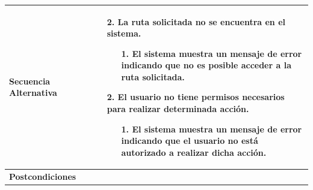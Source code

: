 \begin{longtable}{| p{4cm} | p{10cm} |}
\hline
\textbf{Secuencia Alternativa} &\mbox{}\par\vspace{-\baselineskip}
\begin{enumerate}[leftmargin=0.9cm, topsep=0.1cm]
\item[2.] La ruta solicitada no se encuentra en el sistema.
	\begin{itemize}
	\item[1.] El sistema muestra un mensaje de error indicando que no es posible acceder a la ruta solicitada.
	\end{itemize}
\item[2.] El usuario no tiene permisos necesarios para realizar determinada acción.
	\begin{itemize}
	\item[1.] El sistema muestra un mensaje de error indicando que el usuario no está autorizado a realizar dicha acción.
	\end{itemize}
\end{enumerate}
\\

\hline
\textbf{Postcondiciones} & 
\\
\hline
\end{longtable}



\newpage
